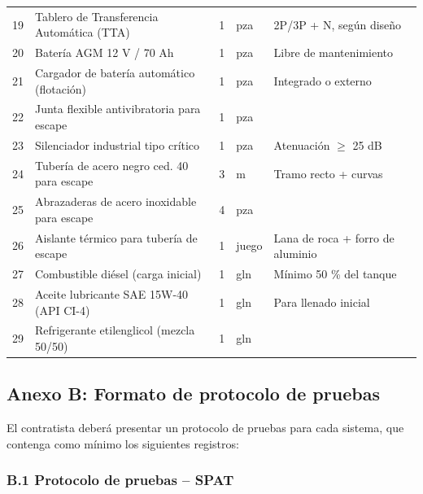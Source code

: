 \documentclass[12pt,a4paper]{article}
\begin{document}
\begin{center}
\begin{tabular}{L{0.5cm}L{3cm}L{1.5cm}L{1.2cm}L{8cm}}
19 & Tablero de Transferencia Automática (TTA) & 1 & pza & 2P/3P + N, según diseño \\
20 & Batería AGM 12 V / 70 Ah & 1 & pza & Libre de mantenimiento \\
21 & Cargador de batería automático (flotación) & 1 & pza & Integrado o externo \\
22 & Junta flexible antivibratoria para escape & 1 & pza & \\
23 & Silenciador industrial tipo crítico & 1 & pza & Atenuación $\geq$ 25 dB \\
24 & Tubería de acero negro ced. 40 para escape & 3 & m & Tramo recto + curvas \\
25 & Abrazaderas de acero inoxidable para escape & 4 & pza & \\
26 & Aislante térmico para tubería de escape & 1 & juego & Lana de roca + forro de aluminio \\
27 & Combustible diésel (carga inicial) & 1 & gln & Mínimo 50 \% del tanque \\
28 & Aceite lubricante SAE 15W-40 (API CI-4) & 1 & gln & Para llenado inicial \\
29 & Refrigerante etilenglicol (mezcla 50/50) & 1 & gln & \\
\bottomrule
\end{tabular}
\end{center}

\subsection{Anexo B: Formato de protocolo de pruebas}

El contratista deberá presentar un protocolo de pruebas para cada sistema, que contenga como mínimo los siguientes registros:

\subsubsection{B.1 Protocolo de pruebas -- SPAT}
\end{document}
